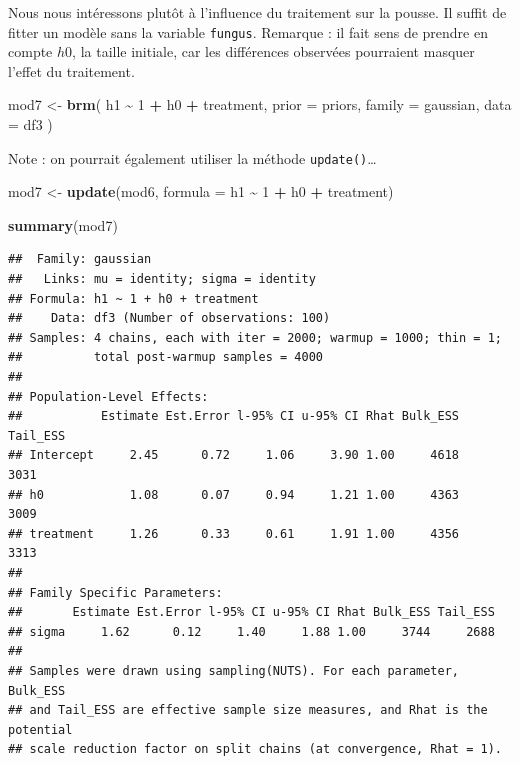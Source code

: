 \documentclass[
  a4paper,11pt,twoside,onecolumn,openright,final,oldfontcommands]{memoir}
\newenvironment{Shaded}{\begin{snugshade}}{\end{snugshade}}
\newcommand{\DataTypeTok}[1]{\textcolor[rgb]{0.13,0.29,0.53}{#1}}
\newcommand{\DecValTok}[1]{\textcolor[rgb]{0.00,0.00,0.81}{#1}}
\newcommand{\KeywordTok}[1]{\textcolor[rgb]{0.13,0.29,0.53}{\textbf{#1}}}
\newcommand{\NormalTok}[1]{#1}
\newcommand{\OperatorTok}[1]{\textcolor[rgb]{0.81,0.36,0.00}{\textbf{#1}}}
\newcommand{\StringTok}[1]{\textcolor[rgb]{0.31,0.60,0.02}{#1}}
\theoremstyle{definition}
\theoremstyle{definition}
\theoremstyle{definition}
\theoremstyle{remark}
\begin{document}
Nous nous intéressons plutôt à l'influence du traitement sur la pousse. Il suffit de fitter un modèle sans la variable \texttt{fungus}. Remarque : il fait sens de prendre en compte \(h0\), la taille initiale, car les différences observées pourraient masquer l'effet du traitement.

\begin{Shaded}
\begin{Highlighting}[]
\NormalTok{mod7 \textless{}{-}}\StringTok{ }\KeywordTok{brm}\NormalTok{(}
\NormalTok{  h1 }\OperatorTok{\textasciitilde{}}\StringTok{ }\DecValTok{1} \OperatorTok{+}\StringTok{ }\NormalTok{h0 }\OperatorTok{+}\StringTok{ }\NormalTok{treatment,}
  \DataTypeTok{prior =}\NormalTok{ priors,}
  \DataTypeTok{family =}\NormalTok{ gaussian,}
  \DataTypeTok{data =}\NormalTok{ df3}
\NormalTok{  )}
\end{Highlighting}
\end{Shaded}

Note : on pourrait également utiliser la méthode \texttt{update()}\ldots{}

\begin{Shaded}
\begin{Highlighting}[]
\NormalTok{mod7 \textless{}{-}}\StringTok{ }\KeywordTok{update}\NormalTok{(mod6, }\DataTypeTok{formula =}\NormalTok{ h1 }\OperatorTok{\textasciitilde{}}\StringTok{ }\DecValTok{1} \OperatorTok{+}\StringTok{ }\NormalTok{h0 }\OperatorTok{+}\StringTok{ }\NormalTok{treatment)}
\end{Highlighting}
\end{Shaded}

\begin{Shaded}
\begin{Highlighting}[]
\KeywordTok{summary}\NormalTok{(mod7)}
\end{Highlighting}
\end{Shaded}

\begin{verbatim}
##  Family: gaussian 
##   Links: mu = identity; sigma = identity 
## Formula: h1 ~ 1 + h0 + treatment 
##    Data: df3 (Number of observations: 100) 
## Samples: 4 chains, each with iter = 2000; warmup = 1000; thin = 1;
##          total post-warmup samples = 4000
## 
## Population-Level Effects: 
##           Estimate Est.Error l-95% CI u-95% CI Rhat Bulk_ESS Tail_ESS
## Intercept     2.45      0.72     1.06     3.90 1.00     4618     3031
## h0            1.08      0.07     0.94     1.21 1.00     4363     3009
## treatment     1.26      0.33     0.61     1.91 1.00     4356     3313
## 
## Family Specific Parameters: 
##       Estimate Est.Error l-95% CI u-95% CI Rhat Bulk_ESS Tail_ESS
## sigma     1.62      0.12     1.40     1.88 1.00     3744     2688
## 
## Samples were drawn using sampling(NUTS). For each parameter, Bulk_ESS
## and Tail_ESS are effective sample size measures, and Rhat is the potential
## scale reduction factor on split chains (at convergence, Rhat = 1).
\end{verbatim}
\end{document}

